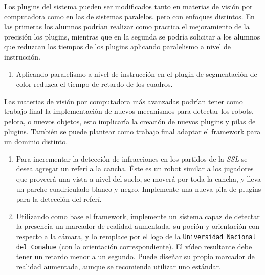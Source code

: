 
Los plugins del sistema pueden ser modificados tanto en materias de visión por
computadora como en las de sistemas paralelos, pero con enfoques distintos. En
las primeras los alumnos podrían realizar como practica el mejoramiento de la
precisión los plugins, mientras que en la segunda se podría solicitar a los
alumnos que reduzcan los tiempos de los plugins aplicando paralelismo a nivel de
instrucción.

\begin{enumerate}

	\item{Aplicando paralelismo a nivel de instrucción en el plugin de
		segmentación de color reduzca el tiempo de retardo de los
		cuadros.}

\end{enumerate}

Las materias de visión por computadora más avanzadas podrían tener como trabajo
final la implementación de nuevos mecanismos para detectar los robots, pelota, o
nuevos objetos, esto implicaría la creación de nuevos plugins y pilas de
plugins. También se puede plantear como trabajo final adaptar el framework para
un dominio distinto.

\begin{enumerate}

	\item{Para incrementar la detección de infracciones en los partidos de
		la \emph{SSL} se desea agregar un referí a la cancha. Éste es un
		robot similar a los jugadores que proveerá una vista a nivel del
		suelo, se moverá por toda la cancha, y lleva un parche
		cuadriculado blanco y negro. Implemente una nueva pila de
		plugins para la detección del referí.}

	\item{Utilizando como base el framework, implemente un sistema capaz de
		detectar la presencia un marcador de realidad aumentada, su poción y
		orientación con respecto a la cámara, y lo remplace por el logo
		de la \texttt{Universidad Nacional del Comahue} (con la
		orientación correspondiente). El vídeo resultante debe tener un
		retardo menor a un segundo. Puede diseñar su propio marcador de
		realidad aumentada, aunque se recomienda utilizar uno estándar.}

\end{enumerate}
